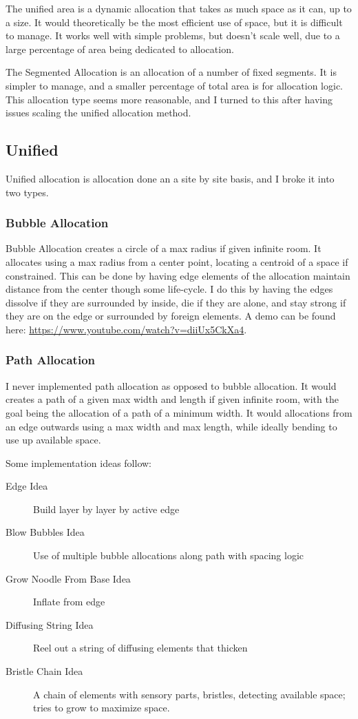 \documentclass[article,12pt,oneside]{memoir}
\begin{document}
The unified area is a dynamic allocation that takes as much space as it can, up to a size.
It would theoretically be the most efficient use of space, but it is difficult to manage.
It works well with simple problems, but doesn't scale well, due to a large percentage of area being dedicated to allocation.

The Segmented Allocation is an allocation of a number of fixed segments.
It is simpler to manage, and a smaller percentage of total area is for allocation logic.
This allocation type seems more reasonable, and I turned to this after having issues scaling the unified allocation method.


\subsection{Unified}

Unified allocation is allocation done an a site by site basis, and I broke it into two types.


\subsubsection{Bubble Allocation}

Bubble Allocation creates a circle of a max radius if given infinite room.
It allocates using a max radius from a center point, locating a centroid of a space if constrained.
This can be done by having edge elements of the allocation maintain distance from the center though some life-cycle.
I do this by having the edges dissolve if they are surrounded by inside, die if they are alone, and stay strong if they are on the edge or surrounded by foreign elements.
A demo can be found here: \url{https://www.youtube.com/watch?v=diiUx5CkXa4}.


\subsubsection{Path Allocation}

I never implemented path allocation as opposed to bubble allocation.
It would creates a path of a given max width and length if given infinite room, with the goal being the allocation of a path of a minimum width.
It would allocations from an edge outwards using a max width and max length, while ideally bending to use up available space.

Some implementation ideas follow:

\begin{description}
	\item[Edge Idea] Build layer by layer by active edge
	\item[Blow Bubbles Idea] Use of multiple bubble allocations along path with spacing logic
	\item[Grow Noodle From Base Idea] Inflate from edge
	\item[Diffusing String Idea] Reel out a string of diffusing elements that thicken
	\item[Bristle Chain Idea] A chain of elements with sensory parts, bristles, detecting available space; tries to grow to maximize space.
\end{description}
\end{document}
